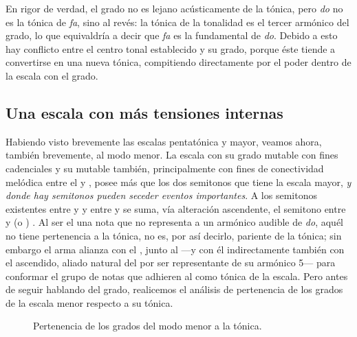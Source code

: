 \documentclass[a4paper,11pt]{article}
\begin{document}
\begin{multicols}{2}
    En rigor de verdad, el  grado no es lejano acústicamente de la tónica, pero \emph{do} no es la tónica de \emph{fa}, sino al revés: la tónica de la tonalidad es el tercer armónico del  grado, lo que equivaldría a decir que \emph{fa} es la fundamental de \emph{do}. Debido a esto hay conflicto entre el centro tonal establecido y su  grado, porque éste tiende a convertirse en una nueva tónica, compitiendo directamente por el poder dentro de la escala con el  grado.

    \subsection{Una escala con más tensiones internas}\label{subsec:esc-mas-tensiones}
    Habiendo visto brevemente las escalas pentatónica y mayor, veamos ahora, también brevemente, al modo menor. La escala  con su  grado mutable con fines cadenciales y su  mutable también, principalmente con fines de conectividad melódica entre el  y , posee más que los dos semitonos que tiene la escala mayor, \emph{y donde hay semitonos pueden seceder eventos importantes}. A los semitonos existentes entre  y  y entre  y  se suma, vía alteración ascendente, el semitono entre  y  (o ) \hbox{.} Al ser el  una nota que no representa a un armónico audible de \emph{do}, aquél no tiene pertenencia a la tónica, no es, por así decirlo, pariente de la tónica; sin embargo el  arma alianza con el , junto al  ---y con él indirectamente también con el  ascendido, aliado natural del  por ser representante de su armónico 5--- para conformar el grupo de notas que adhieren al  como tónica de la escala. Pero antes de seguir hablando del  grado, realicemos el análisis de pertenencia de los grados de la escala menor respecto a su tónica.
\end{multicols}

\begin{figure}[H]
\centering
\caption{Pertenencia de los grados del modo menor a la tónica.}\label{fig:pertenencia-menor}
\end{figure}
\end{document}
